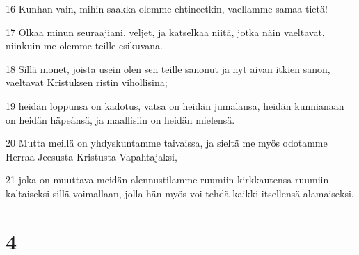 \par 16 Kunhan vain, mihin saakka olemme ehtineetkin, vaellamme samaa tietä!
\par 17 Olkaa minun seuraajiani, veljet, ja katselkaa niitä, jotka näin vaeltavat, niinkuin me olemme teille esikuvana.
\par 18 Sillä monet, joista usein olen sen teille sanonut ja nyt aivan itkien sanon, vaeltavat Kristuksen ristin vihollisina;
\par 19 heidän loppunsa on kadotus, vatsa on heidän jumalansa, heidän kunnianaan on heidän häpeänsä, ja maallisiin on heidän mielensä.
\par 20 Mutta meillä on yhdyskuntamme taivaissa, ja sieltä me myös odotamme Herraa Jeesusta Kristusta Vapahtajaksi,
\par 21 joka on muuttava meidän alennustilamme ruumiin kirkkautensa ruumiin kaltaiseksi sillä voimallaan, jolla hän myös voi tehdä kaikki itsellensä alamaiseksi.

\chapter{4}

